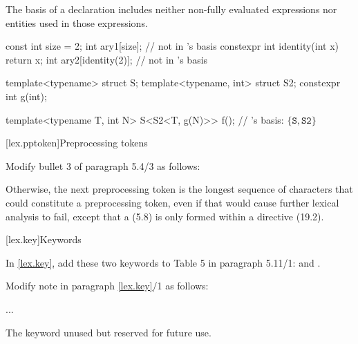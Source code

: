 \begin{undecided}
\begin{std.txt}

\alinea
\enternote
The basis of a declaration includes neither non-fully evaluated expressions nor
entities used in those expressions.
\begin{example}
   \begin{codeblock}
    const int size = 2;
    int ary1[size];                         //  not in 's basis
    constexpr int identity(int x) { return x; }
    int ary2[identity(2)];                  //  not in 's basis

    template<typename> struct S;
    template<typename, int> struct S2;
    constexpr int g(int);

    template<typename T, int N>
    S<S2<T, g(N)>> f();                     // 's basis: $\{ \mathtt{S}, \mathtt{S2} \}$ 
   \end{codeblock}
\end{example}
\exitnote

\end{std.txt}
\end{undecided}

\begin{after}
\setcounter{section}{3}
[lex.pptoken]{Preprocessing tokens}

Modify bullet 3 of paragraph 5.4/3 as follows:

\begin{std.txt}
Otherwise, the next preprocessing token is
the longest sequence of characters
that could constitute a preprocessing token,
even if that would cause further lexical analysis to fail,
except that a  (5.8)
is only formed
within a  directive (19.2).
\end{std.txt}
\end{after}

\setcounter{section}{10}
[lex.key]{Keywords}

In \ref{lex.key}, add these two keywords to Table 5 in paragraph
5.11/1:  and .

\noindent
Modify note in paragraph \ref{lex.key}/1 as follows:
\begin{std.txt}
    \resetalinea[0]
    \alinea
    ...


    \enternote
    The   keyword 
    unused but   
    reserved for future use.
    \exitnote
\end{std.txt}
